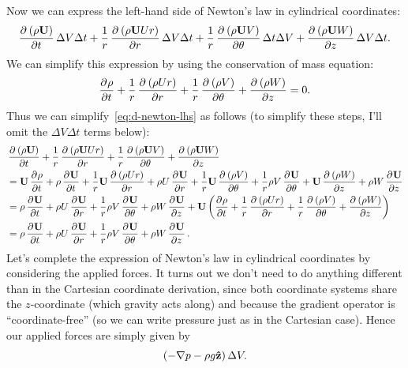 \documentclass{article}
\def\*#1{\mathbf{#1}}
\newcommand{\zhat}{\mathbf{\hat{z}}}
\begin{document}
%
Now we can express the left-hand side of Newton's law in cylindrical
coordinates:
%
\begin{equation}
    \dpd{\del{\rho \*U}}{t} \Delta V \Delta t
    + \frac{1}{r} \dpd{\del{\rho \*U U r}}{r} \Delta V \Delta t
    + \frac{1}{r} \dpd{\del{\rho \*U V}}{\theta} \Delta t \Delta V
    + \dpd{\del{\rho \*U W}}{z} \Delta V \Delta t
    .
    \label{eq:d-newton-lhs}
\end{equation}
%
We can simplify this expression by using the conservation of mass
equation:
%
\begin{equation*}
    \dpd{\rho}{t}
        + \frac{1}{r} \dpd{\del{\rho U r}}{r}
        + \frac{1}{r} \dpd{\del{\rho V}}{\theta}
        + \dpd{\del{\rho W}}{z}
        = 0
        .
\end{equation*}
%
Thus we can simplify~\eqref{eq:d-newton-lhs} as follows (to simplify
these steps, I'll omit the $\Delta V \Delta t$ terms below):
%
\begin{align*}
    &\dpd{\del{\rho \*U}}{t}
    + \frac{1}{r} \dpd{\del{\rho \*U U r}}{r}
    + \frac{1}{r} \dpd{\del{\rho \*U V}}{\theta}
    + \dpd{\del{\rho \*U W}}{z}
    \\
    &=
    \*U \dpd{\rho}{t}
    + \rho \dpd{\*U}{t}
    + \frac{1}{r} \*U \dpd{\del{\rho U r}}{r}
    + \rho U \dpd{\*U}{r}
    + \frac{1}{r} \*U \dpd{\del{\rho V}}{\theta}
    + \frac{1}{r} \rho V \dpd{\*U}{\theta}
    + \*U \dpd{\del{\rho W}}{z}
    + \rho W \dpd{\*U}{z}
    \\
    &=
    \rho \dpd{\*U}{t}
    + \rho U \dpd{\*U}{r}
    + \frac{1}{r} \rho V \dpd{\*U}{\theta}
    + \rho W \dpd{\*U}{z}
    + \*U \del{
        \dpd{\rho}{t}
        + \frac{1}{r} \dpd{\del{\rho U r}}{r}
        + \frac{1}{r} \dpd{\del{\rho V}}{\theta}
        + \dpd{\del{\rho W}}{z}
    }
    \\
    &=
    \rho \dpd{\*U}{t}
    + \rho U \dpd{\*U}{r}
    + \frac{1}{r} \rho V \dpd{\*U}{\theta}
    + \rho W \dpd{\*U}{z}
    .
\end{align*}
%
Let's complete the expression of Newton's law in cylindrical coordinates
by considering the applied forces. It turns out we don't need to do
anything different than in the Cartesian coordinate derivation, since
both coordinate systems share the $z$-coordinate (which gravity acts
along) and because the gradient operator is ``coordinate-free'' (so we
can write pressure just as in the Cartesian case). Hence our applied
forces are simply given by
%
\begin{equation*}
    \del{- \nabla p - \rho g \zhat} \Delta V
    .
\end{equation*}
\end{document}
